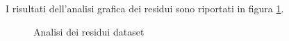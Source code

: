 I risultati dell'analisi grafica dei residui sono riportati in figura \ref{fig:residui_pm2.5}.

\begin{figure}[H]
\centering
{}\hfil
{}

\hfil
{}
\caption{Analisi dei residui dataset }
\label{fig:residui_pm2.5}
\end{figure}

